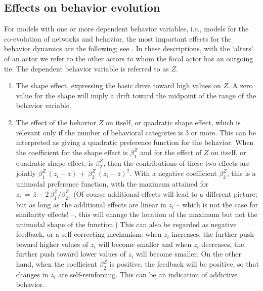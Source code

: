 \documentclass[a4paper,fleqn,11pt]{article}
\newcommand{\+}{\, + \,}
\begin{document}
{\begin{enumerate}
\end{enumerate}


\subsection{Effects on behavior evolution}
\label{S_eff_beh}

For models with one or more dependent behavior variables, i.e.,
models for the co-evolution of networks and behavior,
the most important effects for the behavior dynamics are the following;
see \citet*{SteglichEA10}.
In these descriptions, with the `alters' of an actor
we refer to the other actors to whom
the focal actor has an outgoing tie.
The dependent behavior variable is referred to as $Z$.
\begin{enumerate}
\item The shape effect, expressing the basic drive toward high values on $Z$.
      A zero value for the shape will imply a drift toward the midpoint
      of the range of the behavior variable.
\item The effect of the behavior $Z$ on itself,
      or quadratic shape effect, which is relevant
      only if the number of behavioral categories is 3 or more.
      This can be interpreted as giving a quadratic preference function
      for the behavior.
      When the coefficient for the shape effect is $\beta^Z_1$ and for the
      effect of $Z$ on itself, or quadratic shape effect, is $\beta^Z_2$,
      then the contributions
      of these two effects are jointly $\beta^Z_1\, (z_i - \bar z) \,+\,
                   \beta^Z_2\, (z_i - \bar z)^2$.
      With a negative coefficient $\beta^Z_2$, this
      is a unimodal preference function, with the maximum attained
      for $z_i \,=\, \bar z - 2\,\beta^Z_1/\beta^Z_2$.
      (Of course additional effects will lead to a different picture;
      but as long as the additional effects are linear in $z_i$ -- which is not
      the case for similarity effects! --, this will change the location of the maximum
      but not the unimodal shape of the function.)
      This can also be regarded as negative feedback, or a self-correcting
      mechanism: when $z_i$ increases, the further push toward higher values
      of $z_i$ will become smaller and when $z_i$ decreases, the further push toward lower values
      of $z_i$ will become smaller. On the other hand, when the coefficient $\beta^Z_2$
      is positive, the feedback will be positive, so that changes in $z_i$
      are self-reinforcing. This can be an indication of addictive behavior.

\end{enumerate}}
\end{document}
